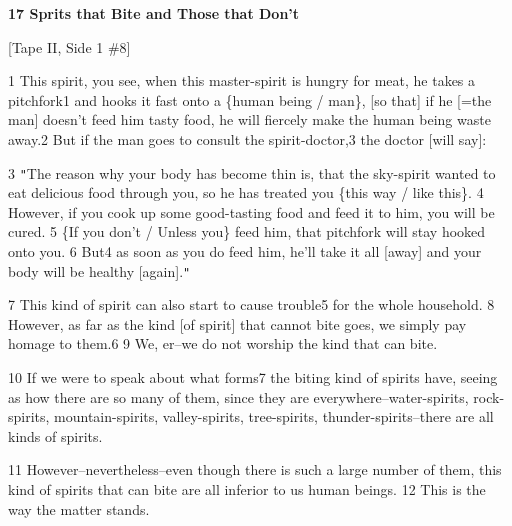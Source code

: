 
\textbf{17 Sprits that Bite and Those that Don't}

[Tape II, Side 1 \#8]

1 This spirit, you see, when this master-spirit is hungry for meat, he takes a
pitchfork1 and hooks it fast onto a \{human being / man\}, [so that] if he [=the
man] doesn't feed him tasty food, he will fiercely make the human being waste away.2
But if the man goes to consult the spirit-doctor,3 the doctor [will say]:

3 \texttt{"}The reason why your body has become thin is, that the sky-spirit wanted
to eat delicious food through you, so he has treated you \{this way / like this\}.
4 However, if you cook up some good-tasting food and feed it to him, you will be
cured. 5 \{If you don't / Unless you\} feed him, that pitchfork will stay hooked
onto you. 6 But4 as soon as you do feed him, he'll take it all [away] and your
body will be healthy [again].\texttt{"}

7 This kind of spirit can also start to cause trouble5 for the whole household.
8 However, as far as the kind [of spirit] that cannot bite goes, we simply pay
homage to them.6 9 We, er--we do not worship the kind that can bite.

10 If we were to speak about what forms7 the biting kind of spirits have, seeing
as how there are so many of them, since they are everywhere--water-spirits, rock-spirits,
mountain-spirits, valley-spirits, tree-spirits, thunder-spirits--there are all
kinds of spirits.

11 However--nevertheless--even though there is such a large number of them, this
kind of spirits that can bite are all inferior to us human beings. 12 This is the
way the matter stands.

